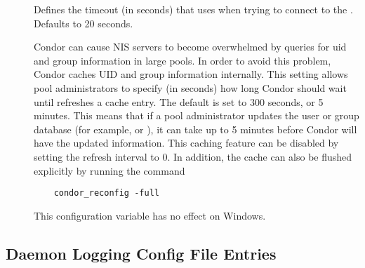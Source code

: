 \begin{description}
\item[] \label{param:QQueryTimeout}
  Defines the timeout (in seconds) that  uses when trying to
  connect to the .  Defaults to 20 seconds.
\item[]
  \label{param:PasswdCacheRefresh}
  Condor can cause NIS servers to become overwhelmed by queries for uid
  and group information in large pools. In order to avoid this problem,
  Condor caches UID and group information internally. This setting allows
  pool administrators to specify (in seconds) how long Condor should wait
  until refreshes a cache entry. The default is set to 300 seconds, or
  5 minutes. This means that if a pool administrator updates the user
  or group database (for example,  or ),
  it can take up
  to 5 minutes before Condor will have the updated information. This
  caching feature can be disabled by setting the refresh interval to
  0. In addition, the cache can also be flushed explicitly by running
  the command
  \begin{verbatim}
    condor_reconfig -full
  \end{verbatim}
  This configuration variable has no effect on Windows.

\end{description}


\subsection{\label{sec:Daemon-Logging-Config-File-Entries}Daemon Logging Config File Entries} 

